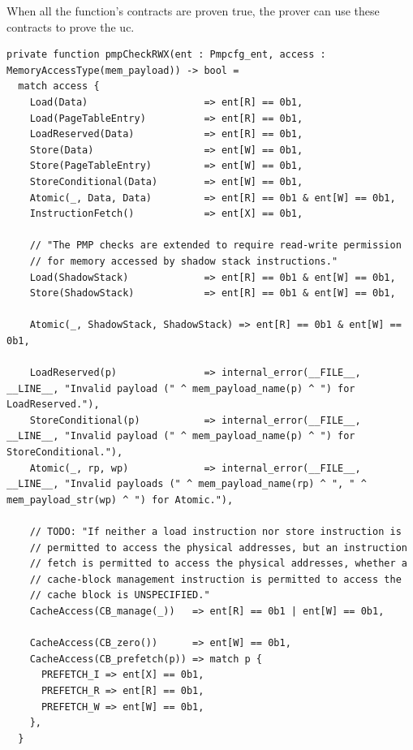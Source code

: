 When all the function's contracts are proven true, the prover can use these contracts to prove the \gls{uc}. 

\begin{lstlisting}[caption=Sail code example, label=lst:sail_code, basicstyle=\tiny]
private function pmpCheckRWX(ent : Pmpcfg_ent, access : MemoryAccessType(mem_payload)) -> bool =
  match access {
    Load(Data)                    => ent[R] == 0b1,
    Load(PageTableEntry)          => ent[R] == 0b1,
    LoadReserved(Data)            => ent[R] == 0b1,
    Store(Data)                   => ent[W] == 0b1,
    Store(PageTableEntry)         => ent[W] == 0b1,
    StoreConditional(Data)        => ent[W] == 0b1,
    Atomic(_, Data, Data)         => ent[R] == 0b1 & ent[W] == 0b1,
    InstructionFetch()            => ent[X] == 0b1,

    // "The PMP checks are extended to require read-write permission
    // for memory accessed by shadow stack instructions."
    Load(ShadowStack)             => ent[R] == 0b1 & ent[W] == 0b1,
    Store(ShadowStack)            => ent[R] == 0b1 & ent[W] == 0b1,

    Atomic(_, ShadowStack, ShadowStack) => ent[R] == 0b1 & ent[W] == 0b1,

    LoadReserved(p)               => internal_error(__FILE__, __LINE__, "Invalid payload (" ^ mem_payload_name(p) ^ ") for LoadReserved."),
    StoreConditional(p)           => internal_error(__FILE__, __LINE__, "Invalid payload (" ^ mem_payload_name(p) ^ ") for StoreConditional."),
    Atomic(_, rp, wp)             => internal_error(__FILE__, __LINE__, "Invalid payloads (" ^ mem_payload_name(rp) ^ ", " ^ mem_payload_str(wp) ^ ") for Atomic."),

    // TODO: "If neither a load instruction nor store instruction is
    // permitted to access the physical addresses, but an instruction
    // fetch is permitted to access the physical addresses, whether a
    // cache-block management instruction is permitted to access the
    // cache block is UNSPECIFIED."
    CacheAccess(CB_manage(_))   => ent[R] == 0b1 | ent[W] == 0b1,

    CacheAccess(CB_zero())      => ent[W] == 0b1,
    CacheAccess(CB_prefetch(p)) => match p {
      PREFETCH_I => ent[X] == 0b1,
      PREFETCH_R => ent[R] == 0b1,
      PREFETCH_W => ent[W] == 0b1,
    },
  }
\end{lstlisting}

